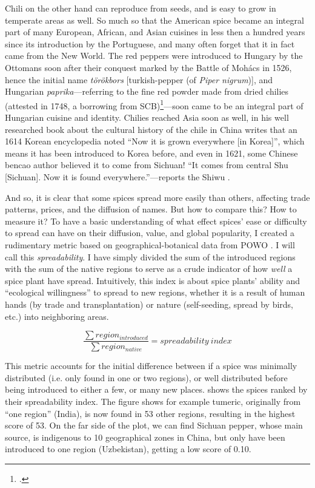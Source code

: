 Chili on the other hand can reproduce from seeds, and is easy to grow in temperate areas as well. So much so that the American spice became an integral part of many European, African, and Asian cuisines in less then a hundred years since its introduction by the Portuguese, and many often forget that it in fact came from the New World. The red peppers were introduced to Hungary by the Ottomans soon after their conquest marked by the Battle of Mohács in 1526, hence the initial name \textit{törökbors} [turkish-pepper (of \textit{Piper nigrum})], and Hungarian \textit{paprika}---referring to the fine red powder made from dried chilies (attested in 1748, a borrowing from \gls{SCB})\footcite[paprika]{zaicz_etimologiai_2006}---soon came to be an integral part of Hungarian cuisine and identity. Chilies reached Asia soon as well, \textcite{dott_chile_2020} in his well researched book about the cultural history of the chile in China writes that an 1614 Korean encyclopedia noted ``Now it is grown everywhere [in Korea]'', which means it has been introduced to Korea before, and even in 1621, some Chinese \gls{bencao} author believed it to come from Sichuan! ``It comes from central Shu [Sichuan]. Now it is found everywhere.''---reports the \gls{Shiwu} \autocite[24,28]{dott_chile_2020}.

And so, it is clear that some spices spread more easily than others, affecting trade patterns, prices, and the diffusion of names. But how to compare this? How to measure it? To have a basic understanding of what effect spices' ease or difficulty to spread can have on their diffusion, value, and global popularity, I created a rudimentary metric based on geographical-botanical data from \gls{POWO} \autocite{powo}. I will call this \textit{spreadability}. I have simply divided the sum of the introduced regions with the sum of the native regions to serve as a crude indicator of how \textit{well} a spice plant have spread. Intuitively, this index is about spice plants' ability and ``ecological willingness'' to spread to new regions, whether it is a result of human hands (by trade and transplantation) or nature (self-seeding, spread by birds, etc.) into neighboring areas. 

\[ \frac{\sum region_{introduced}}{\sum region_{native}} = spreadability~index \]

\noindent This metric accounts for the initial difference between if a spice was minimally distributed (i.e. only found in one or two regions), or well distributed before being introduced to either a few, or many new places.  shows the spices ranked by their spreadability index. The figure shows for example tumeric, originally from ``one region'' (India), is now found in 53 other regions, resulting in the highest score of 53. On the far side of the plot, we can find Sichuan pepper, whose main source,  is indigenous to 10 geographical zones in China, but only have been introduced to one region (Uzbekistan), getting a low score of 0.10.



